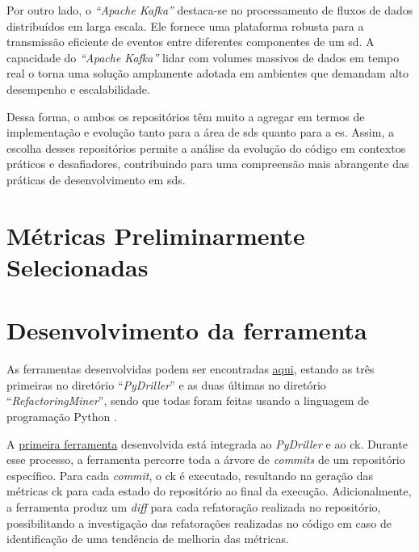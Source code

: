 Por outro lado, o \textit{``Apache Kafka''} destaca-se no processamento de fluxos de dados distribuídos em larga escala. Ele fornece uma plataforma robusta para a transmissão eficiente de eventos entre diferentes componentes de um \gls{sd}. A capacidade do \textit{``Apache Kafka''} lidar com volumes massivos de dados em tempo real o torna uma solução amplamente adotada em ambientes que demandam alto desempenho e escalabilidade.

Dessa forma, o ambos os repositórios têm muito a agregar em termos de implementação e evolução tanto para a área de \gls{sds} quanto para a \gls{es}. Assim, a escolha desses repositórios permite a análise da evolução do código em contextos práticos e desafiadores, contribuindo para uma compreensão mais abrangente das práticas de desenvolvimento em \gls{sds}.

\section{Métricas Preliminarmente Selecionadas}

\section{Desenvolvimento da ferramenta}
As ferramentas desenvolvidas podem ser encontradas \href{https://github.com/BrenoFariasdaSilva/Scientific-Research}{aqui}, estando as três primeiras no diretório ``\textit{PyDriller}'' e as duas últimas no diretório ``\textit{RefactoringMiner}'', sendo que todas foram feitas usando a linguagem de programação Python \cite{PythonProgrammingLanguage}.

A \href{https://github.com/BrenoFariasdaSilva/Scientific-Research/blob/main/PyDriller/metrics_changes.py}{primeira ferramenta} desenvolvida está integrada ao \textit{PyDriller} e ao \gls{ck}. Durante esse processo, a ferramenta percorre toda a árvore de \textit{commits} de um repositório específico. Para cada \textit{commit}, o \gls{ck} é executado, resultando na geração das métricas \gls{ck} para cada estado do repositório ao final da execução. Adicionalmente, a ferramenta produz um \textit{diff} para cada refatoração realizada no repositório, possibilitando a investigação das refatorações realizadas no código em caso de identificação de uma tendência de melhoria das métricas.


